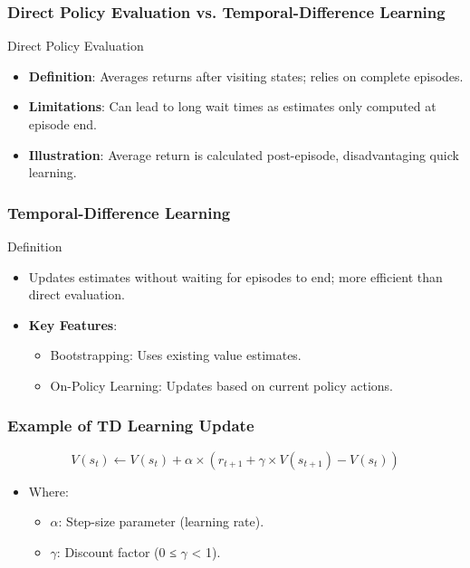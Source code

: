 \documentclass[aspectratio=169]{beamer}
\begin{document}
\begin{frame}[fragile]
    \frametitle{Direct Policy Evaluation vs. Temporal-Difference Learning}
    \begin{block}{Direct Policy Evaluation}
        \begin{itemize}
            \item \textbf{Definition}: Averages returns after visiting states; relies on complete episodes.
            \item \textbf{Limitations}: Can lead to long wait times as estimates only computed at episode end.
            \item \textbf{Illustration}: Average return is calculated post-episode, disadvantaging quick learning.
        \end{itemize}
    \end{block}
\end{frame}

\begin{frame}[fragile]
    \frametitle{Temporal-Difference Learning}
    \begin{block}{Definition}
        \begin{itemize}
            \item Updates estimates without waiting for episodes to end; more efficient than direct evaluation.
            \item \textbf{Key Features}:
            \begin{itemize}
                \item Bootstrapping: Uses existing value estimates.
                \item On-Policy Learning: Updates based on current policy actions.
            \end{itemize}
        \end{itemize}
    \end{block}
\end{frame}

\begin{frame}[fragile]
    \frametitle{Example of TD Learning Update}
    \begin{equation}
    V(s_t) \leftarrow V(s_t) + \alpha \times (r_{t+1} + \gamma \times V(s_{t+1}) - V(s_t))
    \end{equation}
    \begin{itemize}
        \item Where:
        \begin{itemize}
            \item $\alpha$: Step-size parameter (learning rate).
            \item $\gamma$: Discount factor (0 ≤ $\gamma$ < 1).
        \end{itemize}
    \end{itemize}
\end{frame}
\end{document}
